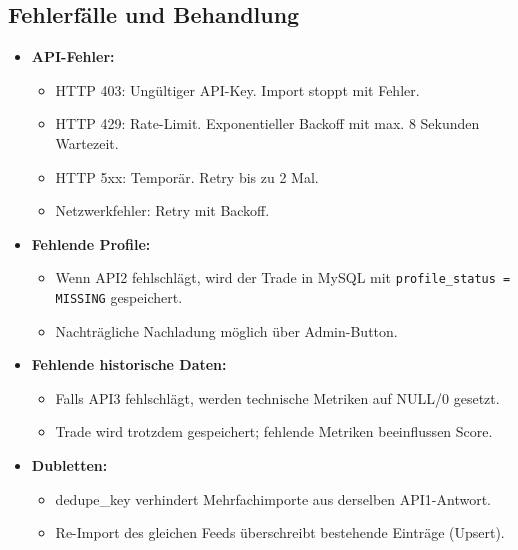 \subsection{Fehlerfälle und Behandlung}
\begin{itemize}
  \item \textbf{API-Fehler:}
    \begin{itemize}
      \item HTTP 403: Ungültiger API-Key. Import stoppt mit Fehler.
      \item HTTP 429: Rate-Limit. Exponentieller Backoff mit max. 8 Sekunden Wartezeit. %
      \item HTTP 5xx: Temporär. Retry bis zu 2 Mal.
      \item Netzwerkfehler: Retry mit Backoff.
    \end{itemize}
  \item \textbf{Fehlende Profile:}
    \begin{itemize}
      \item Wenn API2 fehlschlägt, wird der Trade in MySQL mit \texttt{profile\_status = MISSING} gespeichert. %
      \item Nachträgliche Nachladung möglich über Admin-Button.
    \end{itemize}
  \item \textbf{Fehlende historische Daten:}
    \begin{itemize}
      \item Falls API3 fehlschlägt, werden technische Metriken auf NULL/0 gesetzt.
      \item Trade wird trotzdem gespeichert; fehlende Metriken beeinflussen Score.
    \end{itemize}
  \item \textbf{Dubletten:}
    \begin{itemize}
      \item dedupe\_key verhindert Mehrfachimporte aus derselben API1-Antwort.
      \item Re-Import des gleichen Feeds überschreibt bestehende Einträge (Upsert).
    \end{itemize}
\end{itemize}
